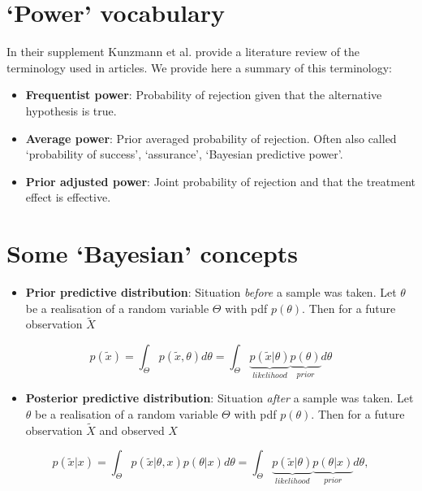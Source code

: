 \documentclass[
]{book}
\providecommand{\tightlist}{%
  \setlength{\itemsep}{0pt}\setlength{\parskip}{0pt}}
\begin{document}
\hypertarget{power-vocabulary}{%
\section{`Power' vocabulary}\label{power-vocabulary}}

In their supplement Kunzmann et al. \citet{Kunzmann2022} provide a literature review of the terminology used in articles. We provide here a summary of this terminology:

\begin{itemize}
\tightlist
\item
  \textbf{Frequentist power}: Probability of rejection given that the alternative hypothesis is true.
\item
  \textbf{Average power}: Prior averaged probability of rejection. Often also called `probability of success', `assurance', `Bayesian predictive power'.
\item
  \textbf{Prior adjusted power}: Joint probability of rejection and that the treatment effect is effective.
\end{itemize}

\hypertarget{some-bayesian-concepts}{%
\section{Some `Bayesian' concepts}\label{some-bayesian-concepts}}

\begin{itemize}
\tightlist
\item
  \textbf{Prior predictive distribution}: Situation \emph{before} a sample was taken. Let \(\theta\) be a realisation of a random variable \(\Theta\) with pdf \(p(\theta)\). Then for a future observation \(\tilde X\)
\end{itemize}

\[
p(\tilde x)=\int_\Theta p(\tilde x, \theta)d\theta=\int_\Theta \underbrace{p(\tilde x | \theta)}_{likelihood}\underbrace{p(\theta)}_{prior}d\theta
\]

\begin{itemize}
\tightlist
\item
  \textbf{Posterior predictive distribution}: Situation \emph{after} a sample was taken. Let \(\theta\) be a realisation of a random variable \(\Theta\) with pdf \(p(\theta)\). Then for a future observation \(\tilde X\) and observed \(X\)
\end{itemize}

\[
p(\tilde x|x)=\int_\Theta p(\tilde x | \theta, x)p(\theta|x)d\theta=\int_\Theta \underbrace{p(\tilde x | \theta)}_{likelihood}\underbrace{p(\theta|x)}_{prior}d\theta,
\]
\end{document}
